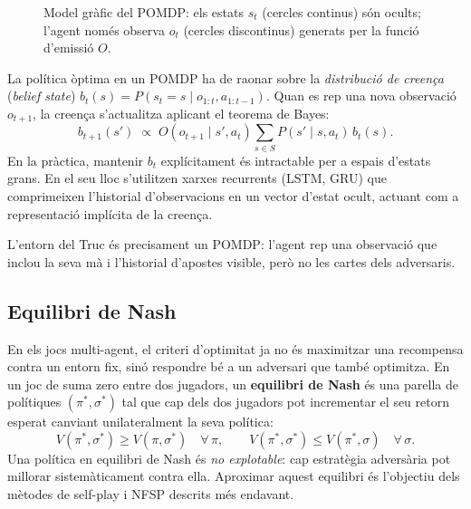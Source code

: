 \begin{figure}[H]
  \centering
  \caption[Model gràfic del \acs{POMDP}.]{Model gràfic del \acs{POMDP}: els estats $s_t$ (cercles continus) són
           ocults; l'agent només observa $o_t$ (cercles discontinus) generats per
           la funció d'emissió $O$.}
  \label{fig:pomdp}
\end{figure}

La política òptima en un \ac{POMDP} ha de raonar sobre la
\emph{distribució de creença} (\emph{belief state}) $b_t(s) = P(s_t = s \mid
o_{1:t}, a_{1:t-1})$. Quan es rep una nova observació $o_{t+1}$, la creença
s'actualitza aplicant el teorema de Bayes:
\[
  b_{t+1}(s') \;\propto\; O(o_{t+1} \mid s', a_t)
  \sum_{s \in S} P(s' \mid s, a_t)\, b_t(s).
\]
En la pràctica, mantenir $b_t$ explícitament és intractable per a espais
d'estats grans. En el seu lloc s'utilitzen xarxes recurrents (LSTM, GRU)
que comprimeixen l'historial d'observacions en un vector d'estat
ocult, actuant com a representació implícita de la creença.

L'entorn del Truc és precisament un \ac{POMDP}: l'agent rep una observació
que inclou la seva mà i l'historial d'apostes visible, però no les cartes dels
adversaris.

\FloatBarrier
\subsection*{Equilibri de Nash}

En els jocs multi-agent, el criteri d'optimitat ja no és maximitzar una
recompensa contra un entorn fix, sinó respondre bé a un adversari que també
optimitza. En un joc de suma zero entre dos jugadors, un \textbf{equilibri de
Nash} és una parella de polítiques $(\pi^*, \sigma^*)$ tal que cap dels dos
jugadors pot incrementar el seu retorn esperat canviant unilateralment la seva
política:
\[
  V(\pi^*, \sigma^*) \geq V(\pi, \sigma^*) \quad \forall\,\pi, \qquad
  V(\pi^*, \sigma^*) \leq V(\pi^*, \sigma) \quad \forall\,\sigma.
\]
Una política en equilibri de Nash és \emph{no explotable}: cap estratègia
adversària pot millorar sistemàticament contra ella. Aproximar aquest equilibri
és l'objectiu dels mètodes de self-play i \ac{NFSP} descrits més endavant.

